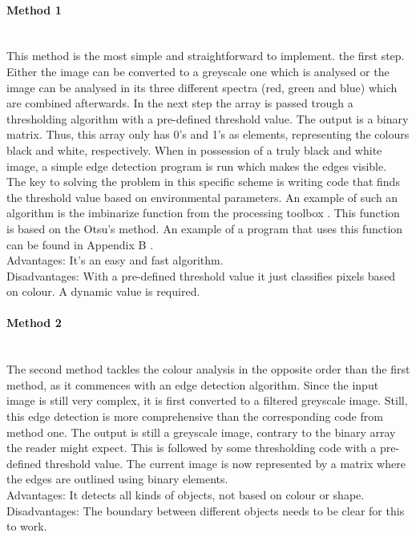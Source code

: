 \documentclass{article}
\begin{document}
\paragraph{Method 1}\mbox{}\\
This method is the most simple and straightforward to implement. the first step. Either the image can be converted to a greyscale one which is analysed or the image can be analysed in its three different spectra (red, green and blue) which are combined afterwards. In the next step the array is passed trough a thresholding algorithm with a pre-defined threshold value. The output is a binary matrix. Thus, this array only has 0's and 1's as elements, representing the colours black and white, respectively. When in possession of a truly black and white image, a simple edge detection program is run which makes the edges visible.\\
The key to solving the problem in this specific scheme is writing code that finds the threshold value based on environmental parameters. An example of such an algorithm is the imbinarize function from the processing toolbox \cite{Mathworks}. This function is based on the Otsu's method. An example of a program that uses this function can be found in Appendix B \cite{threshold}.
\\Advantages: It’s an easy and fast algorithm.
\\Disadvantages: With a pre-defined threshold value it just classifies pixels based on colour. A dynamic value is required.
\paragraph{Method 2}\mbox{}\\
The second method tackles the colour analysis in the opposite order than the first method, as it commences with an edge detection algorithm. Since the input image is still very complex, it is first converted to a filtered greyscale image. Still, this edge detection is more comprehensive than the corresponding code from method one. The output is still a greyscale image, contrary to the binary array the reader might expect. This is followed by some thresholding code with a pre-defined threshold value. The current image is now represented by a matrix where the edges are outlined using binary elements.
\\Advantages: It detects all kinds of objects, not based on colour or shape.
\\Disadvantages: The boundary between different objects needs to be clear for this to work.
\end{document}
